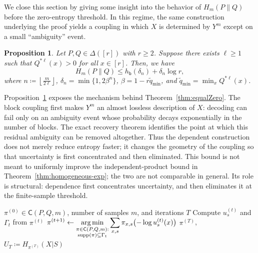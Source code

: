 \documentclass[journal]{IEEEtran}
\def\argmin{\mathop{\rm arg\, min}}
\newtheorem{proposition}{Proposition}
\def\supp{\mathop{\rm supp}}
\def\argmin{\mathop{\rm arg\, min}}
\newcommand{\1}{\mathbf{1}}
\begin{document}
We close this section by giving some insight into the behavior of $H_m(P\|Q)$
before the zero-entropy threshold. In this regime, the same construction underlying the proof yields a coupling in which $X$ is determined by $Y^m$ except on a small ``ambiguity'' event.
\begin{proposition}\label{prop:dependent-exp}
Let $P,Q\in \Delta([r])$ with $r\ge2$. Suppose there exists $\ell\ge1$ such that $Q^{*\ell}(x)>0$ for all $x\in[r]$. Then, we have 
$$H_{m}(P\|Q)\le h_{\mathsf b}(\delta_n)+\delta_n\log r, $$
where $n\coloneqq \left\lfloor\frac{m}{2\ell}\right\rfloor$, $\delta_n=\min\{1,2\beta^n\}$, $\beta=1-r\widetilde q_{\min}$, and $\widetilde q_{\min}=\min_x Q^{*\ell}(x)$. 
\end{proposition}
Proposition~\ref{prop:dependent-exp} exposes the mechanism behind
Theorem~\ref{thm:equalZero}. The block coupling first makes $Y^m$ an almost
lossless description of $X$: decoding can fail only on an ambiguity event
whose probability decays exponentially in the number of blocks. The exact
recovery theorem identifies the point at which this residual ambiguity can be
removed altogether. Thus the dependent construction does not merely reduce
entropy faster; it changes the geometry of the coupling so that uncertainty is
first concentrated and then eliminated. This bound is not meant to uniformly
improve the independent-product bound in Theorem~\ref{thm:homogeneous-exp};
the two are not comparable in general. Its role is structural: dependence first
concentrates uncertainty, and then eliminates it at the finite-sample
threshold.


\begin{algorithm}[t]
\caption{Greedy algorithm for \(H_m(P\|Q)\)}
\label{alg:Hstar-refined}
\begin{algorithmic}[1]
\Require \(\pi^{(0)}\in\mathsf C(P,Q,m)\), number of samples $m$, and iterations \(T\)
\State Compute \(u_s^{(t)}\) and \(\Gamma_t\) from $\pi^{(t)}$
\State \(\displaystyle 
\pi^{(t+1)} \leftarrow 
\argmin_{\substack{\pi\in\mathsf C(P,Q,m):\\ \supp(\pi)\subseteq\Gamma_t}}
\sum_{x,s}\pi_{x,s}\bigl(-\log u_s^{(t)}(x)\bigr)\)
\EndFor
\State \Return \(\pi^{(T)}\), \(U_T\coloneqq H_{\pi^{(T)}}(X|S)\)
\end{algorithmic}
\end{algorithm}
\end{document}
